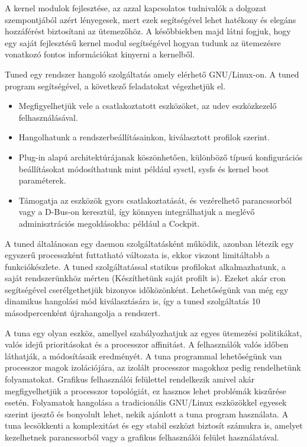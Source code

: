 A kernel modulok fejlesztése, az azzal kapcsolatos tudnivalók a dolgozat szempontjából azért lényegesek, mert ezek segítségével lehet hatékony és elegáns hozzáférést biztosítani az ütemezőhöz.
A későbbiekben majd látni fogjuk, hogy egy saját fejlesztésű kernel modul segítségével hogyan tudunk az ütemezésre vonatkozó fontos információkat kinyerni a kernelből.


Tuned egy rendszer hangoló szolgáltatás amely elérhető GNU/Linux-on.
A tuned program segítségével, a következő feladatokat végezhetjük el.
\begin{itemize}
\item Megfigyelhetjük vele a csatlakoztatott eszközöket, az udev eszközkezelő felhasználásával.
\item Hangolhatunk a rendszerbeállításainkon, kiválasztott profilok szerint.
\item Plug-in alapú architektúrájanak köszönhetően, különböző típusú konfigurációs beállításokat módosíthatunk mint például sysctl, sysfs és kernel boot paraméterek.
\item Támogatja az eszközök gyors csatlakoztatását, és vezérelhető parancssorból vagy a D-Bus-on keresztül, így könnyen integrálhatjuk a meglévő adminisztrációs megoldásokba: például a Cockpit.
\end{itemize}

A tuned általánosan egy daemon szolgáltatásként működik, azonban létezik egy egyszerű processzként futtatható változata is, ekkor viszont limitáltabb a funkciókészlete.
A tuned szolgáltatással statikus profilokat alkalmazhatunk, a saját rendszerünkhöz mérten (Készíthetünk saját profilt is).
Ezeket akár cron segítségével cserélgethetjük bizonyos időközönként.
Lehetőségünk van még egy dinamikus hangolási mód kiválasztására is, így a tuned szolgáltatás 10 másodpercenként újrahangolja a rendszert.


A tuna egy olyan eszköz, amellyel szabályozhatjuk az egyes ütemezési politikákat, valós idejű prioritásokat és a processzor affinitást. 
A felhasználók valós időben láthatják, a módosításaik eredményét.
A tuna programmal lehetőségünk van processzor magok izolációjára, az izolált processzor magokhoz pedig rendelhetünk folyamatokat.
Grafikus felhasználói felülettel rendelkezik amivel akár megfigyelhetjük a processzor topológiát, ez hasznos lehet problémák kiszűrése esetén.
Folyamatok hangolása a tradicionális GNU/Linux eszközökkel egyesek szerint ijesztő és bonyolult lehet, nekik ajánlott a tuna program használata. A tuna lecsökkenti a komplexitást és egy stabil eszközt biztosít számukra is, amelyet kezelhetnek parancssorból vagy a grafikus felhasználói felület használatával.

